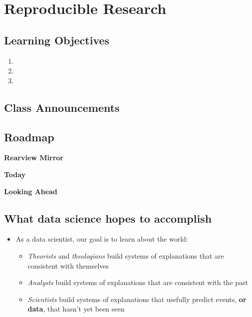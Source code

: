 \documentclass[
]{book}
\providecommand{\tightlist}{%
  \setlength{\itemsep}{0pt}\setlength{\parskip}{0pt}}
\theoremstyle{definition}
\theoremstyle{definition}
\theoremstyle{definition}
\theoremstyle{definition}
\theoremstyle{remark}
\begin{document}
\chapter{Reproducible Research}\label{reproducible-research}

\section{Learning Objectives}\label{learning-objectives-12}

\begin{enumerate}
\def\labelenumi{\arabic{enumi}.}
\tightlist
\item
\item
\item
\end{enumerate}

\section{Class Announcements}\label{class-announcements-11}

\section{Roadmap}\label{roadmap-9}

\textbf{Rearview Mirror}

\textbf{Today}

\textbf{Looking Ahead}

\section{What data science hopes to accomplish}\label{what-data-science-hopes-to-accomplish}

\begin{itemize}
\tightlist
\item
  As a data scientist, our goal is to learn about the world:

  \begin{itemize}
  \tightlist
  \item
    \emph{Theorists} and \emph{theologians} build systems of explanations that are consistent with themselves
  \item
    \emph{Analysts} build systems of explanations that are consistent with the past
  \item
    \emph{Scientists} build systems of explanations that usefully predict events, \textbf{or data}, that hasn't yet been seen
  \end{itemize}
\end{itemize}
\end{document}
